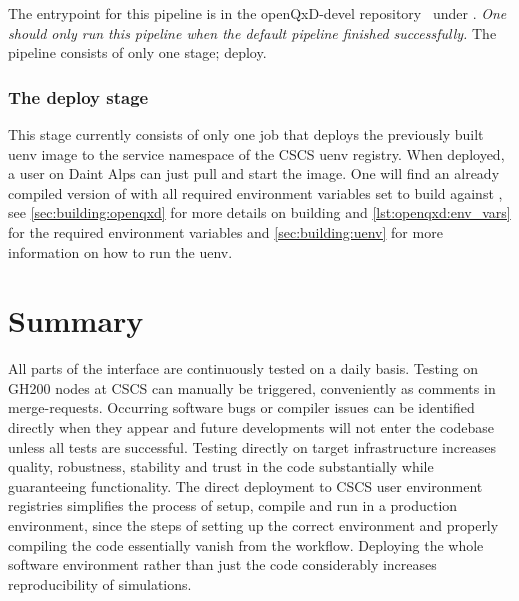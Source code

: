 The entrypoint for this pipeline is in the openQxD-devel repository~\cite{gitlab:openqxd-devel} under .
\emph{One should only run this pipeline when the default pipeline finished successfully.}
The pipeline consists of only one stage; deploy.

\subsubsection{The deploy stage}

This stage currently consists of only one job that deploys the previously built uenv image to the service namespace of the CSCS uenv registry.
When deployed, a user on Daint Alps can just pull and start the image.
One will find an already compiled version of \quda with all required environment variables set to build \openqxd against \quda, see \cref{sec:building:openqxd} for more details on building \openqxd and \cref{lst:openqxd:env_vars} for the required environment variables and \cref{sec:building:uenv} for more information on how to run the uenv.

\section{Summary}
\label{sec:cicd:summary}

All parts of the interface are continuously tested on a daily basis.
Testing on GH200 nodes at CSCS can manually be triggered, conveniently as comments in merge-requests.
Occurring software bugs or compiler issues can be identified directly when they appear and future developments will not enter the codebase unless all tests are successful.
Testing directly on target infrastructure increases quality, robustness, stability and trust in the code substantially while guaranteeing functionality.
The direct deployment to CSCS user environment registries simplifies the process of setup, compile and run in a production environment, since the steps of setting up the correct environment and properly compiling the code essentially vanish from the workflow.
Deploying the whole software environment rather than just the code considerably increases reproducibility of simulations.

